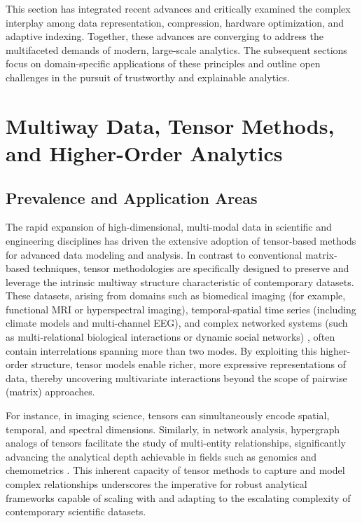 \documentclass[sigconf]{acmart}
\begin{document}
\bigskip

This section has integrated recent advances and critically examined the complex interplay among data representation, compression, hardware optimization, and adaptive indexing. Together, these advances are converging to address the multifaceted demands of modern, large-scale analytics. The subsequent sections focus on domain-specific applications of these principles and outline open challenges in the pursuit of trustworthy and explainable analytics.

\section{Multiway Data, Tensor Methods, and Higher-Order Analytics}

\subsection{Prevalence and Application Areas}

The rapid expansion of high-dimensional, multi-modal data in scientific and engineering disciplines has driven the extensive adoption of tensor-based methods for advanced data modeling and analysis. In contrast to conventional matrix-based techniques, tensor methodologies are specifically designed to preserve and leverage the intrinsic multiway structure characteristic of contemporary datasets. These datasets, arising from domains such as biomedical imaging (for example, functional MRI or hyperspectral imaging), temporal-spatial time series (including climate models and multi-channel EEG), and complex networked systems (such as multi-relational biological interactions or dynamic social networks) \cite{ref104}, often contain interrelations spanning more than two modes. By exploiting this higher-order structure, tensor models enable richer, more expressive representations of data, thereby uncovering multivariate interactions beyond the scope of pairwise (matrix) approaches.

For instance, in imaging science, tensors can simultaneously encode spatial, temporal, and spectral dimensions. Similarly, in network analysis, hypergraph analogs of tensors facilitate the study of multi-entity relationships, significantly advancing the analytical depth achievable in fields such as genomics and chemometrics \cite{ref104}. This inherent capacity of tensor methods to capture and model complex relationships underscores the imperative for robust analytical frameworks capable of scaling with and adapting to the escalating complexity of contemporary scientific datasets.
\end{document}
